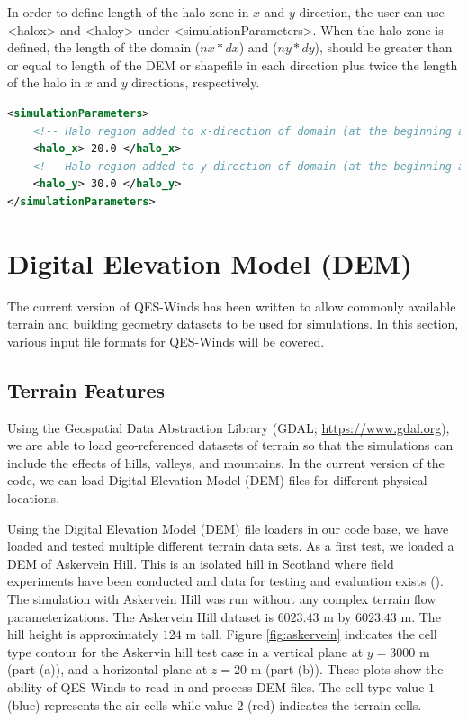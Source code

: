 In order to define length of the halo zone in $x$ and $y$ direction, the user can use <halo\textunderscore x> and <halo\textunderscore y> under <simulationParameters>. When the halo zone is defined, the length of the domain ($nx*dx$) and ($ny*dy$), should be greater than or equal to length of the DEM or shapefile in each direction plus twice the length of the halo in $x$ and $y$ directions, respectively.

\begin{lstlisting}[language=XML]
<simulationParameters>
	<!-- Halo region added to x-direction of domain (at the beginning and the end of domain) (meters)-->
	<halo_x> 20.0 </halo_x>
	<!-- Halo region added to y-direction of domain (at the beginning and the end of domain) (meters)-->
	<halo_y> 30.0 </halo_y>						
</simulationParameters>
\end{lstlisting}


\section{Digital Elevation Model (DEM)}

The current version of QES-Winds has been written to allow commonly available terrain and building geometry datasets to be used for simulations. In this section, various input file formats for QES-Winds will be covered.

\subsection{Terrain Features}

Using the Geospatial Data Abstraction Library (GDAL; \href{https://www.gdal.org}{https://www.gdal.org}), we are able to load geo-referenced datasets of terrain so that the simulations can include the effects of hills, valleys, and mountains. In the current version of the code, we can load Digital Elevation Model (DEM) files for different physical locations.

Using the Digital Elevation Model (DEM) file loaders in our code base, we have loaded and tested multiple different terrain data sets. As a first test, we loaded a DEM of Askervein Hill. This is an isolated hill in Scotland where field experiments have been conducted and data for testing and evaluation exists (\cite{taylor1987askervein,mickle1988askervein}). The simulation with Askervein Hill was run without any complex terrain flow parameterizations. The Askervein Hill dataset is $6023.43$ m by $6023.43$ m. The hill height is approximately $124$ m tall. Figure \ref{fig:askervein} indicates the cell type contour for the Askervin hill test case in a vertical plane at $y = 3000$ m (part (a)), and a horizontal plane at $z=20$ m (part (b)). These plots show the ability of QES-Winds to read in and process DEM files. The cell type value $1$ (blue) represents the air cells while value $2$ (red) indicates the terrain cells.

